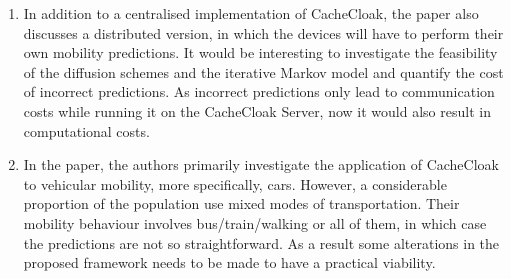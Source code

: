 \begin{enumerate}

	\item In addition to a centralised implementation of CacheCloak, the paper also discusses a distributed
	version, in which the devices will have to perform their own mobility predictions. It would
	be interesting to investigate the feasibility of the diffusion schemes and the iterative Markov model and
	quantify the cost of incorrect predictions. As incorrect predictions only lead to communication costs
	while running it on the CacheCloak Server, now it would also result in computational costs. 
	
	\item In the paper, the authors primarily investigate the application of CacheCloak to 
	vehicular mobility, more specifically, cars. However, a considerable proportion of the 
	population use mixed modes of transportation. Their mobility behaviour involves bus/train/walking	
	or all of them, in which case the predictions are not so straightforward. As a result 
	some alterations in the proposed framework needs to be made to have a practical viability. 
	
\end{enumerate}

